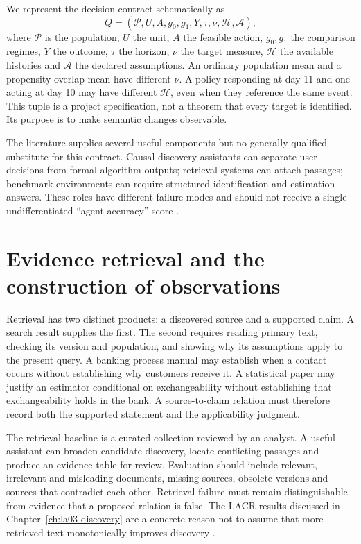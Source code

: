 We represent the decision contract schematically as
\[
 Q=(\mathcal P,U,A,g_0,g_1,Y,\tau,\nu,\mathcal H,\mathcal A),
\]
where $\mathcal P$ is the population, $U$ the unit, $A$ the feasible action,
$g_0,g_1$ the comparison regimes, $Y$ the outcome, $\tau$ the horizon, $\nu$ the
target measure, $\mathcal H$ the available histories and $\mathcal A$ the declared
assumptions. An ordinary population mean and a propensity-overlap mean have
different $\nu$. A policy responding at day 11 and one acting at day 10 may have
different $\mathcal H$, even when they reference the same event. This tuple is a
project specification, not a theorem that every target is identified. Its
purpose is to make semantic changes observable.

The literature supplies several useful components but no generally qualified
substitute for this contract. Causal discovery assistants can separate user
decisions from formal algorithm outputs; retrieval systems can attach passages;
benchmark environments can require structured identification and estimation
answers. These roles have different failure modes and should not receive a
single undifferentiated ``agent accuracy'' score
\citep{v12_la_2606_23608,v12_la_2402_15301,v12_la_package_causalds}.

\section{Evidence retrieval and the construction of observations}

Retrieval has two distinct products: a discovered source and a supported claim.
A search result supplies the first. The second requires reading primary text,
checking its version and population, and showing why its assumptions apply to
the present query. A banking process manual may establish when a contact occurs
without establishing why customers receive it. A statistical paper may justify
an estimator conditional on exchangeability without establishing that
exchangeability holds in the bank. A source-to-claim relation must therefore
record both the supported statement and the applicability judgment.

The retrieval baseline is a curated collection reviewed by an analyst. A useful
assistant can broaden candidate discovery, locate conflicting passages and
produce an evidence table for review. Evaluation should include relevant,
irrelevant and misleading documents, missing sources, obsolete versions and
sources that contradict each other. Retrieval failure must remain distinguishable
from evidence that a proposed relation is false. The LACR results discussed in
Chapter~\ref{ch:la03-discovery} are a concrete reason not to assume that more retrieved
text monotonically improves discovery \citep{v12_la_2402_15301}.

